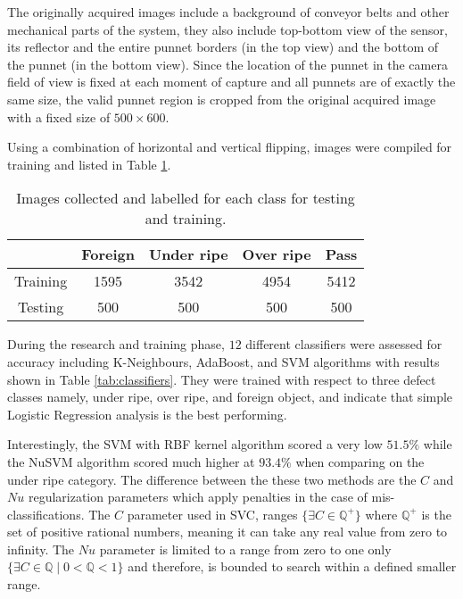 \documentclass[conference]{IEEEtran}
\begin{document}
The originally acquired images include a background of conveyor belts and other mechanical parts of the system, they also include top-bottom view of the sensor, its reflector and the entire punnet borders (in the top view) and the bottom of the punnet (in the bottom view). Since the location of the punnet in the camera field of view is fixed at each moment of capture and all punnets are of exactly the same size, the valid punnet region is cropped from the original acquired image with a fixed size of $500 \times 600$. 


Using a combination of horizontal and vertical flipping, images were compiled for training and listed in Table \ref{tab:data}.


\begin{table}[h]
	\centering
	\caption{Images collected and labelled for each class for testing and training.}
	\label{tab:data}
	\begin{tabular}{c c c c c} 
		\hline
		& Foreign & Under ripe & Over ripe & Pass \\ [0.5ex] 
		\hline
		Training & 1595 &  3542 & 4954 &  5412 \\
		Testing & 500 & 500 & 500 & 500 \\ [1ex] 
		\hline
	\end{tabular}
\end{table}



During the research and training phase, $12$ different classifiers were assessed for accuracy including K-Neighbours, AdaBoost, and SVM algorithms with results shown in Table \ref{tab:classifiers}. They were trained with respect to three defect classes namely, under ripe, over ripe, and foreign object, and indicate that simple Logistic Regression analysis is the best performing. 


Interestingly, the SVM with RBF kernel algorithm scored a very low $51.5\%$ while the NuSVM algorithm scored much higher at $93.4\%$ when comparing on the under ripe category. The difference between the these two methods are the $C$ and $Nu$ regularization parameters which apply penalties in the case of mis-classifications. The $C$ parameter used in SVC, ranges $\{\exists C\in\mathbb{Q^+}\}$ where $\mathbb{Q^+}$ is the set of positive rational numbers, meaning it can take any real value from zero to infinity. The $Nu$ parameter is limited to a range from zero to one only $\{\exists C\in\mathbb{Q} \mid 0 <\mathbb{Q} < 1\}$ and therefore, is bounded to search within a defined smaller range. 
\end{document}
